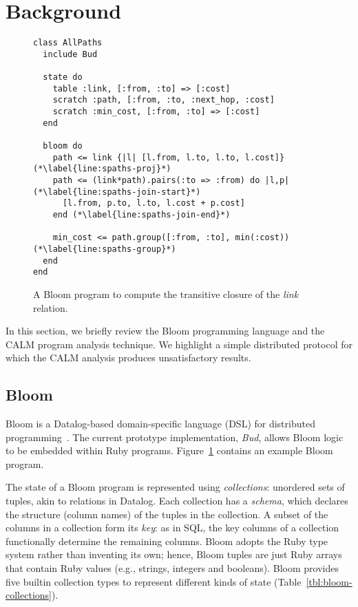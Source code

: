 \section{Background}
\label{sec:background}

\begin{figure}[t]
\begin{scriptsize}
\begin{lstlisting}
class AllPaths
  include Bud

  state do
    table :link, [:from, :to] => [:cost]
    scratch :path, [:from, :to, :next_hop, :cost]
    scratch :min_cost, [:from, :to] => [:cost]
  end

  bloom do
    path <= link {|l| [l.from, l.to, l.to, l.cost]} (*\label{line:spaths-proj}*)
    path <= (link*path).pairs(:to => :from) do |l,p| (*\label{line:spaths-join-start}*)
      [l.from, p.to, l.to, l.cost + p.cost]
    end (*\label{line:spaths-join-end}*)

    min_cost <= path.group([:from, :to], min(:cost)) (*\label{line:spaths-group}*)
  end
end
\end{lstlisting}
\end{scriptsize}
\caption{A Bloom program to compute the transitive closure of the
  \emph{link} relation.}
\label{fig:bloom-spaths}
\end{figure}

In this section, we briefly review the Bloom programming language and the CALM
program analysis technique.  We highlight a simple distributed protocol for
which the CALM analysis produces unsatisfactory results.

\subsection{Bloom}
\label{sec:bg-bloom}

Bloom is a Datalog-based domain-specific language (DSL) for distributed
programming~\cite{Alvaro2011,bloom}. The current prototype implementation,
\emph{Bud}, allows Bloom logic to be embedded within Ruby
programs. Figure~\ref{fig:bloom-spaths} contains an example Bloom program.

The state of a Bloom program is represented using \emph{collections}: unordered
sets of tuples, akin to relations in Datalog. Each collection has a
\emph{schema}, which declares the structure (column names) of the tuples in the
collection. A subset of the columns in a collection form its \emph{key}: as in
SQL, the key columns of a collection functionally determine the remaining
columns. Bloom adopts the Ruby type system rather than inventing its own; hence,
Bloom tuples are just Ruby arrays that contain Ruby values (e.g., strings,
integers and booleans). Bloom provides five builtin collection types to
represent different kinds of state (Table~\ref{tbl:bloom-collections}).

